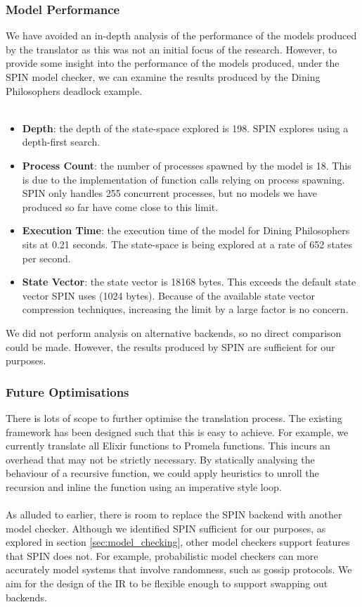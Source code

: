 \subsubsection{Model Performance}
We have avoided an in-depth analysis of the performance of the models produced by the translator as this was not an initial focus of the research. However, to provide some insight into the performance of the models produced, under the SPIN model checker, we can examine the results produced by the Dining Philosophers deadlock example.
\\ \\
\begin{itemize}
    \item \textbf{Depth}: the depth of the state-space explored is 198. SPIN explores using a depth-first search. 
    \item \textbf{Process Count}: the number of processes spawned by the model is 18. This is due to the implementation of function calls relying on process spawning. SPIN only handles 255 concurrent processes, but no models we have produced so far have come close to this limit.
    \item \textbf{Execution Time}: the execution time of the model for Dining Philosophers sits at 0.21 seconds. The state-space is being explored at a rate of 652 states per second.
    \item \textbf{State Vector}: the state vector is 18168 bytes. This exceeds the default state vector SPIN uses (1024 bytes). Because of the available state vector compression techniques, increasing the limit by a large factor is no concern.
\end{itemize}
We did not perform analysis on alternative backends, so no direct comparison could be made. However, the results produced by SPIN are sufficient for our purposes.
\subsubsection{Future Optimisations}
There is lots of scope to further optimise the translation process. The existing framework has been designed such that this is easy to achieve. For example, we currently translate all Elixir functions to Promela functions. This incurs an overhead that may not be strictly necessary. By statically analysing the behaviour of a recursive function, we could apply heuristics to unroll the recursion and inline the function using an imperative style loop.
\\ \\
As alluded to earlier, there is room to replace the SPIN backend with another model checker. Although we identified SPIN sufficient for our purposes, as explored in section \ref{sec:model_checking}, other model checkers support features that SPIN does not. For example, probabilistic model checkers can more accurately model systems that involve randomness, such as gossip protocols. We aim for the design of the IR to be flexible enough to support swapping out backends. 
